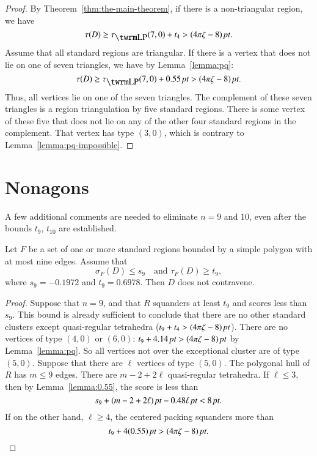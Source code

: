 \begin{proof} By Theorem~\ref{thm:the-main-theorem},
if there is a non-triangular region, we have
    $$\tau(D)\ge\tlp(7,0)+t_4>\squander.$$
Assume that all standard regions are triangular.  If there is a
vertex that does not lie on one of seven triangles, we have by
Lemma~\ref{lemma:pq}:
    $$\tau(D)\ge\tlp(7,0)+0.55\,\pt>\squander.$$
Thus, all vertices lie on one of the seven triangles.  The
complement of these seven triangles is a region triangulation by
five standard regions.  There is some vertex of these five that does
not lie on any of the other four standard regions in the complement.
That vertex has type $(3,0)$, which is contrary to
Lemma~\ref{lemma:pq-impossible}.
\end{proof}

\section{Nonagons} %
    \label{sec:nonagon}

A few additional comments are needed to eliminate $n=9$ and $10$,
even after the bounds $t_9$, $t_{10}$ are established.

\begin{lemma} \label{lemma:s9-t9}
Let $F$ be a set of one or more standard regions bounded by a simple
polygon with at most nine edges.  Assume  that
    $$\sigma_F(D) \le s_9\quad\text{and }\tau_F(D)\ge t_9,$$
where $s_9=-0.1972$ and $t_9=0.6978$.  Then $D$ does not
contravene.
\end{lemma}

\begin{proof}
Suppose that $n=9$, and that $R$ squanders at least $t_9$ and
scores less than $s_9$.  This bound is already sufficient to
conclude that there are no other standard clusters except
quasi-regular tetrahedra ($t_9+t_4>(4\pi\zeta-8)\,\hbox{\it pt}$). There are no
vertices of type $(4,0)$ or $(6,0)$: $t_9+4.14\,\hbox{\it pt}>(4\pi\zeta-8)\,\hbox{\it pt}$ by
Lemma~\ref{lemma:pq}.   So all vertices not over the exceptional
cluster are of type $(5,0)$. Suppose that there are $\ell$
vertices of type $(5,0)$. The polygonal hull of $R$ has $m\le 9$
edges. There are $m-2+2\ell$ quasi-regular tetrahedra. If $\ell\le
3$, then by Lemma~\ref{lemma:0.55}, the score is less than
    $$s_9+ (m-2+2\ell)\,\hbox{\it pt} -0.48 \ell\,\hbox{\it pt} < 8\,\hbox{\it pt}.$$
If on the other hand, $\ell\ge 4$, the centered packing squanders
more than
    $$t_9+ 4(0.55)\,\hbox{\it pt} > (4\pi\zeta-8)\,\hbox{\it pt}.$$
\end{proof}


